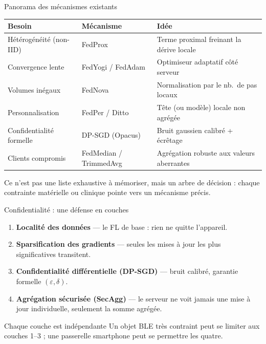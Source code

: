 \documentclass[aspectratio=169,11pt]{beamer}
\begin{document}
\begin{frame}{Panorama des mécanismes existants}
  \centering
  \footnotesize
  \begin{tabular}{lll}
    \toprule
    Besoin & Mécanisme & Idée \\
    \midrule
    Hétérogénéité (non-IID) & FedProx & Terme proximal freinant la dérive
      locale \\
    Convergence lente & FedYogi / FedAdam & Optimiseur adaptatif côté
      serveur \\
    Volumes inégaux & FedNova & Normalisation par le nb.\ de pas locaux \\
    Personnalisation & FedPer / Ditto & Tête (ou modèle) locale non
      agrégée \\
    Confidentialité formelle & DP-SGD (Opacus) & Bruit gaussien calibré +
      écrêtage \\
    Clients compromis & FedMedian / TrimmedAvg & Agrégation robuste aux
      valeurs aberrantes \\
    \bottomrule
  \end{tabular}
  \vspace{1em}

  Ce n'est pas une liste exhaustive à mémoriser, mais un arbre de décision :
  chaque contrainte matérielle ou clinique pointe vers un mécanisme précis.
\end{frame}

\begin{frame}{Confidentialité : une défense en couches}
  \small
  \begin{enumerate}
    \item \textbf{Localité des données} --- le FL de base : rien ne quitte
      l'appareil.
    \item \textbf{Sparsification des gradients} --- seules les mises à jour
      les plus significatives transitent.
    \item \textbf{Confidentialité différentielle (DP-SGD)} --- bruit
      calibré, garantie formelle $(\varepsilon,\delta)$.
    \item \textbf{Agrégation sécurisée (SecAgg)} --- le serveur ne voit
      jamais une mise à jour individuelle, seulement la somme agrégée.
  \end{enumerate}
  \vspace{0.5em}
  \begin{block}{Chaque couche est indépendante}
    \small Un objet BLE très contraint peut se limiter aux couches 1--3 ;
    une passerelle smartphone peut se permettre les quatre.
  \end{block}
\end{frame}
\end{document}
